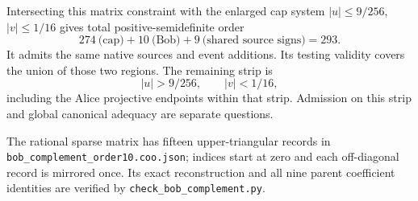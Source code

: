 Intersecting this matrix constraint with the enlarged cap system
$|u|\leq9/256$, $|v|\leq1/16$ gives total positive-semidefinite order
\[
       274\ \text{(cap)}+10\ \text{(Bob)}
                 +9\ \text{(shared source signs)}=293.
\]
It admits the same native sources and event additions. Its testing
validity covers the union of those two regions. The remaining strip is
\[
                  |u|>9/256,\qquad |v|<1/16,
\]
including the Alice projective endpoints within that strip. Admission
on this strip and global canonical adequacy are separate questions.

The rational sparse matrix has fifteen upper-triangular records in
\texttt{bob\_complement\_order10.coo.json}; indices start at zero and
each off-diagonal record is mirrored once. Its exact reconstruction
and all nine parent coefficient identities are verified by
\texttt{check\_bob\_complement.py}.

